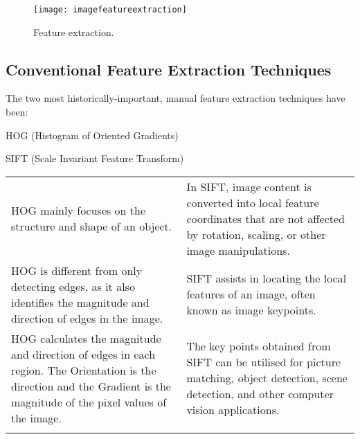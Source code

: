 	\begin{figure}[h]
		\centering
		\texttt{[image: imagefeatureextraction]}
		\caption{Feature extraction.}
		\label{fig:imagefeatureextraction}
	\end{figure}

	\subsection{Conventional Feature Extraction Techniques}
The two most historically-important, manual feature extraction techniques have been:
	\begin{bulletedlist}
		\item HOG (Histogram of Oriented Gradients)
		\item SIFT (Scale Invariant Feature Transform)
	\end{bulletedlist}

	\begin{topcaptiontable}
        \centering
        \lecaption{}
        \label{tab:}
		\begin{tabular}{|p{}|p{}|} \hline
				\tablecolumnheadervlinesone{HOG} & \tablecolumnheadervlinestwo{SIFT} \\ \hline
				HOG mainly focuses on the structure and shape of an object. &
	            In SIFT, image content is converted into local feature coordinates that are not affected by rotation, scaling, or other
	image manipulations. \\ \hline
				HOG is different from only detecting edges, as it also identifies the magnitude and direction of edges in the image. &
	            SIFT assists in locating the local features of an image, often known as image keypoints. \\ \hline
				HOG calculates the magnitude and direction of edges in each region. The Orientation is the direction and the Gradient is the magnitude of the pixel values of the image. &
				The key points obtained from SIFT can be utilised for picture matching, object detection, scene detection, and other computer vision applications. \\ \hline
				\adjustbox{center}{\texttt{[image: hogfeaturedetection]}} &
				\adjustbox{center}{\texttt{[image: siftfeaturedetection]}} \\ \hline
		\end{tabular}
	\end{topcaptiontable}

